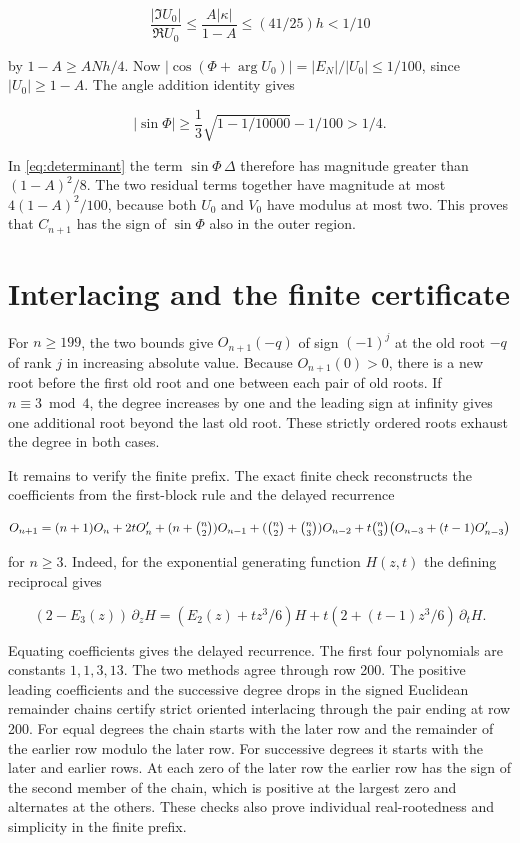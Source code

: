 \documentclass[11pt]{article}
\begin{document}
\begin{equation*}
\frac{|\Im U_0|}{\Re U_0}\le\frac{A|\kappa|}{1-A}
\le(41/25)h<1/10
\end{equation*}

by $1-A\ge A Nh/4$. Now $|\cos(\Phi+\arg U_0)|=|E_N|/|U_0|\le1/100$, since $|U_0|\ge1-A$. The angle addition identity gives

\begin{equation*}
|\sin\Phi|\ge\frac13\sqrt{1-1/10000}-1/100>1/4.
\end{equation*}

In \eqref{eq:determinant} the term $\sin\Phi\,\Delta$ therefore has magnitude greater than $(1-A)^2/8$. The two residual terms together have magnitude at most $4(1-A)^2/100$, because both $U_0$ and $V_0$ have modulus at most two. This proves that $C_{n+1}$ has the sign of $\sin\Phi$ also in the outer region.


\section{Interlacing and the finite certificate}\label{sec:finite}

For $n\ge199$, the two bounds give $O_{n+1}(-q)$ of sign $(-1)^j$ at the old root $-q$ of rank $j$ in increasing absolute value. Because $O_{n+1}(0)>0$, there is a new root before the first old root and one between each pair of old roots. If $n\equiv3\bmod4$, the degree increases by one and the leading sign at infinity gives one additional root beyond the last old root. These strictly ordered roots exhaust the degree in both cases.

It remains to verify the finite prefix. The exact finite check reconstructs the coefficients from the first-block rule and the delayed recurrence

\begin{equation*}
O_{n+1}=(n+1)O_n+2tO_n'+(n+\tbinom n2)O_{n-1}
       +(\tbinom n2+\tbinom n3)O_{n-2}
       +t\tbinom n3\bigl(O_{n-3}+(t-1)O_{n-3}'\bigr)
\end{equation*}

for $n\ge3$. Indeed, for the exponential generating function $H(z,t)$ the defining reciprocal gives

\begin{equation*}
(2-E_3(z))\,\partial_z H
=(E_2(z)+tz^3/6)H+t(2+(t-1)z^3/6)\,\partial_t H.
\end{equation*}

Equating coefficients gives the delayed recurrence. The first four polynomials are constants $1,1,3,13$. The two methods agree through row 200. The positive leading coefficients and the successive degree drops in the signed Euclidean remainder chains certify strict oriented interlacing through the pair ending at row 200. For equal degrees the chain starts with the later row and the remainder of the earlier row modulo the later row. For successive degrees it starts with the later and earlier rows. At each zero of the later row the earlier row has the sign of the second member of the chain, which is positive at the largest zero and alternates at the others. These checks also prove individual real-rootedness and simplicity in the finite prefix.
\end{document}
